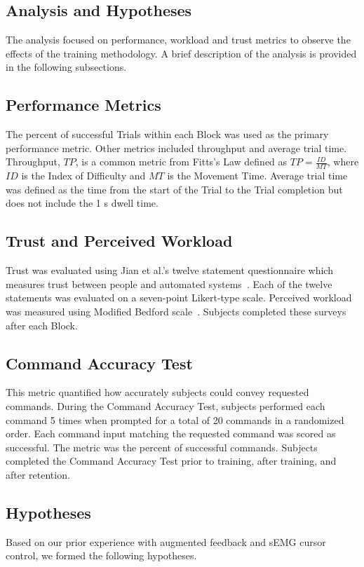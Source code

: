 \begin{mdframed}[hidealllines=true,backgroundcolor=blue!20]
	\section{Analysis and Hypotheses}
	The analysis focused on performance, workload and trust metrics to observe the effects of the training methodology.
	A brief description of the analysis is provided in the following subsections.

	\subsection{Performance Metrics}
	The percent of successful Trials within each Block was used as the primary performance metric.
	Other metrics included throughput and average trial time.
	Throughput, $TP$, is a common metric from Fitts's Law defined as $TP = \frac{ID}{MT}$, where $ID$ is the Index of Difficulty and $MT$ is the Movement Time.
	Average trial time was defined as the time from the start of the Trial to the Trial completion but does not include the 1 s dwell time.

	\subsection{Trust and Perceived Workload}
	Trust was evaluated using Jian et al.'s twelve statement questionnaire which measures trust between people and automated systems~\citep{jian_foundations_2000}.
	Each of the twelve statements was evaluated on a seven-point Likert-type scale.
	Perceived workload was measured using Modified Bedford scale~\citep{roscoe_subjective_1990}.
	Subjects completed these surveys after each Block.

	\subsection{Command Accuracy Test}
	This metric quantified how accurately subjects could convey requested commands.
	During the Command Accuracy Test, subjects performed each command 5 times when prompted for a total of 20 commands in a randomized order.
	Each command input matching the requested command was scored as successful.
	The metric was the percent of successful commands.
	Subjects completed the Command Accuracy Test prior to training, after training, and after retention.
\end{mdframed}

\subsection{Hypotheses}
Based on our prior experience with augmented feedback and sEMG cursor control, we formed the following hypotheses.

